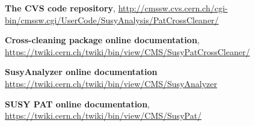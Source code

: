 \documentclass{cmspaper}
\begin{document}
\pagebreak
\begin{thebibliography}{9}
 {\bf The CVS code repository},
\underline{http://cmssw.cvs.cern.ch/cgi-bin/cmssw.cgi/UserCode/SusyAnalysis/PatCrossCleaner/}

 {\bf Cross-cleaning package online documentation},
\underline{https://twiki.cern.ch/twiki/bin/view/CMS/SusyPatCrossCleaner/}

 {\bf SusyAnalyzer online documentation}
\underline{https://twiki.cern.ch/twiki/bin/view/CMS/SusyAnalyzer}

 {\bf SUSY PAT online documentation},
\underline{https://twiki.cern.ch/twiki/bin/view/CMS/SusyPat/}
\end{thebibliography}

\end{document}
